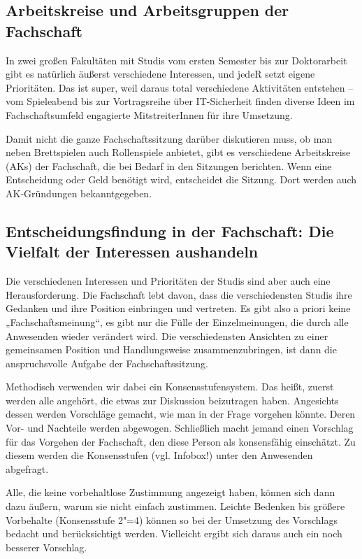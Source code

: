 
\subsection*{Arbeitskreise und Arbeitsgruppen der Fachschaft}

In zwei großen Fakultäten mit Studis vom ersten Semester bis zur Doktorarbeit gibt es natürlich äußerst verschiedene Interessen, und jedeR setzt eigene Prioritäten. Das ist super, weil daraus total verschiedene Aktivitäten entstehen -- vom Spieleabend bis zur Vortragsreihe über IT-Sicherheit finden diverse Ideen im Fachschaftsumfeld engagierte MitstreiterInnen für ihre Umsetzung.

Damit nicht die ganze Fachschaftssitzung darüber diskutieren muss, ob man neben Brettspielen auch Rollenspiele anbietet, gibt es verschiedene Arbeitskreise (AKs) der Fachschaft, die bei Bedarf in den Sitzungen berichten. Wenn eine Entscheidung oder Geld benötigt wird, entscheidet die Sitzung. Dort werden auch AK-Gründungen bekanntgegeben.

\subsection*{Entscheidungsfindung in der Fachschaft: Die Vielfalt der Interessen aushandeln}


Die verschiedenen Interessen und Prioritäten der Studis sind aber auch eine Herausforderung. Die Fachschaft lebt davon, dass die verschiedensten Studis ihre Gedanken und ihre Position einbringen und vertreten. Es gibt also a priori keine „Fachschaftsmeinung“, es gibt nur die Fülle der Einzelmeinungen, die durch alle Anwesenden wieder verändert wird. Die verschiedensten Ansichten zu einer gemeinsamen Position und Handlungsweise zusammenzubringen, ist dann die anspruchsvolle Aufgabe der Fachschaftssitzung.

Methodisch verwenden wir dabei ein Konsensstufensystem. Das heißt, zuerst werden alle angehört, die etwas zur Diskussion beizutragen haben. Angesichts dessen werden Vorschläge gemacht, wie man in der Frage vorgehen könnte. Deren Vor- und Nachteile werden abgewogen. Schließlich macht jemand einen Vorschlag für das Vorgehen der Fachschaft, den diese Person als konsensfähig einschätzt. Zu diesem werden die Konsensstufen (vgl. Infobox!) unter den Anwesenden abgefragt.

Alle, die keine vorbehaltlose Zustimmung angezeigt haben, können sich dann dazu äußern, warum sie nicht einfach zustimmen. Leichte Bedenken bis größere Vorbehalte (Konsensstufe 2"=4) können so bei der Umsetzung des Vorschlags bedacht und berücksichtigt werden. Vielleicht ergibt sich daraus auch ein noch besserer Vorschlag.

